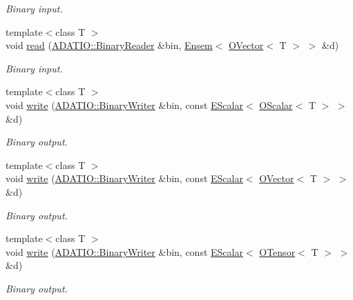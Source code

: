 \begin{DoxyCompactItemize}
\begin{DoxyCompactList}\small\item\em Binary input. \end{DoxyCompactList}\item 
{\footnotesize template$<$class T $>$ }\\void \mbox{\hyperlink{namespaceENSEM_aebc1e0b81049724d5c9a99befb160609}{read}} (\mbox{\hyperlink{classADATIO_1_1BinaryReader}{A\+D\+A\+T\+I\+O\+::\+Binary\+Reader}} \&bin, \mbox{\hyperlink{classENSEM_1_1Ensem}{Ensem}}$<$ \mbox{\hyperlink{classENSEM_1_1OVector}{O\+Vector}}$<$ T $>$ $>$ \&d)
\begin{DoxyCompactList}\small\item\em Binary input. \end{DoxyCompactList}\item 
{\footnotesize template$<$class T $>$ }\\void \mbox{\hyperlink{namespaceENSEM_a0cbc421b6e399674cc0f2faf6ca73e9e}{write}} (\mbox{\hyperlink{classADATIO_1_1BinaryWriter}{A\+D\+A\+T\+I\+O\+::\+Binary\+Writer}} \&bin, const \mbox{\hyperlink{classENSEM_1_1EScalar}{E\+Scalar}}$<$ \mbox{\hyperlink{classENSEM_1_1OScalar}{O\+Scalar}}$<$ T $>$ $>$ \&d)
\begin{DoxyCompactList}\small\item\em Binary output. \end{DoxyCompactList}\item 
{\footnotesize template$<$class T $>$ }\\void \mbox{\hyperlink{namespaceENSEM_a50d31b905b65f0286fa9c7204b5a6b19}{write}} (\mbox{\hyperlink{classADATIO_1_1BinaryWriter}{A\+D\+A\+T\+I\+O\+::\+Binary\+Writer}} \&bin, const \mbox{\hyperlink{classENSEM_1_1EScalar}{E\+Scalar}}$<$ \mbox{\hyperlink{classENSEM_1_1OVector}{O\+Vector}}$<$ T $>$ $>$ \&d)
\begin{DoxyCompactList}\small\item\em Binary output. \end{DoxyCompactList}\item 
{\footnotesize template$<$class T $>$ }\\void \mbox{\hyperlink{namespaceENSEM_aedacdfb4390e718c515314cad71d66ea}{write}} (\mbox{\hyperlink{classADATIO_1_1BinaryWriter}{A\+D\+A\+T\+I\+O\+::\+Binary\+Writer}} \&bin, const \mbox{\hyperlink{classENSEM_1_1EScalar}{E\+Scalar}}$<$ \mbox{\hyperlink{classENSEM_1_1OTensor}{O\+Tensor}}$<$ T $>$ $>$ \&d)
\begin{DoxyCompactList}\small\item\em Binary output. \end{DoxyCompactList}\item 

\end{DoxyCompactItemize}
